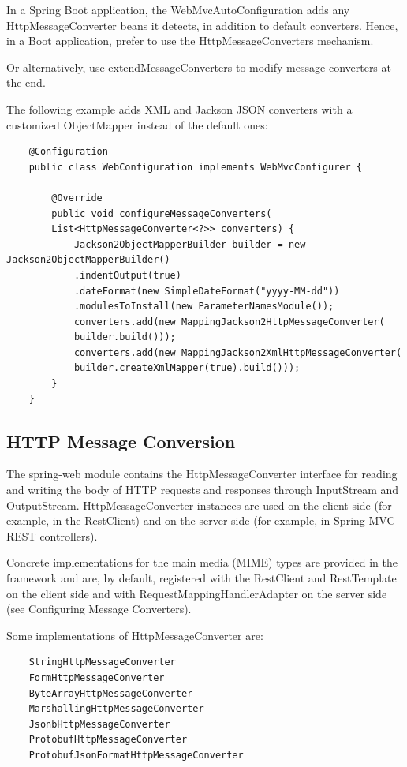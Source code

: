 \documentclass{scrartcl}
\begin{document}
In a Spring Boot application, the WebMvcAutoConfiguration adds any HttpMessageConverter beans it detects, in addition to default converters. Hence, in a Boot application, prefer to use the HttpMessageConverters mechanism.

Or alternatively, use extendMessageConverters to modify message converters at the end.

The following example adds XML and Jackson JSON converters with a customized ObjectMapper instead of the default ones:

\begin{lstlisting}
    @Configuration
    public class WebConfiguration implements WebMvcConfigurer {

        @Override
        public void configureMessageConverters(
        List<HttpMessageConverter<?>> converters) {
            Jackson2ObjectMapperBuilder builder = new Jackson2ObjectMapperBuilder()
            .indentOutput(true)
            .dateFormat(new SimpleDateFormat("yyyy-MM-dd"))
            .modulesToInstall(new ParameterNamesModule());
            converters.add(new MappingJackson2HttpMessageConverter(
            builder.build()));
            converters.add(new MappingJackson2XmlHttpMessageConverter(
            builder.createXmlMapper(true).build()));
        }
    }
\end{lstlisting}

\subsection{HTTP Message Conversion}

The spring-web module contains the HttpMessageConverter interface for reading and writing the body of HTTP requests and responses through InputStream and OutputStream. HttpMessageConverter instances are used on the client side (for example, in the RestClient) and on the server side (for example, in Spring MVC REST controllers).

Concrete implementations for the main media (MIME) types are provided in the framework and are, by default, registered with the RestClient and RestTemplate on the client side and with RequestMappingHandlerAdapter on the server side (see Configuring Message Converters).

Some implementations of HttpMessageConverter are:

    \begin{lstlisting}
    StringHttpMessageConverter
    FormHttpMessageConverter
    ByteArrayHttpMessageConverter
    MarshallingHttpMessageConverter
    JsonbHttpMessageConverter
    ProtobufHttpMessageConverter
    ProtobufJsonFormatHttpMessageConverter
    \end{lstlisting}
\end{document}
